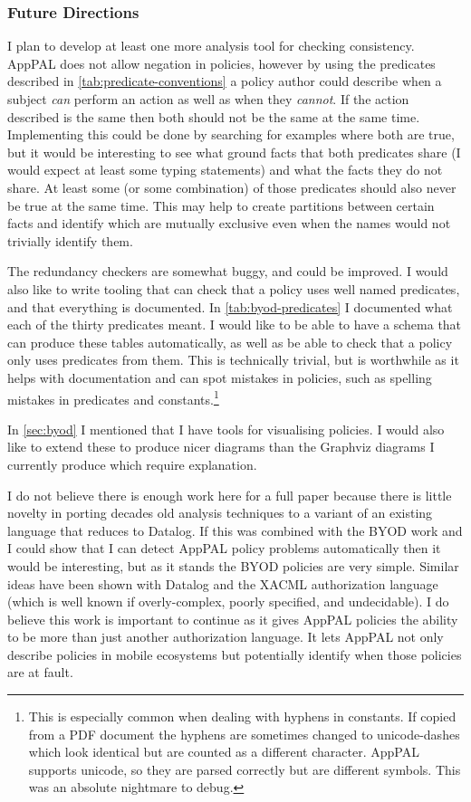 \documentclass[a4paper]{scrartcl}
\begin{document}
\subsubsection*{Future Directions}

I plan to develop at least one more analysis tool for checking consistency.
AppPAL does not allow negation in policies, however by using the predicates
described in \autoref{tab:predicate-conventions} a policy author could describe
when a subject \emph{can} perform an action as well as when they \emph{cannot}.
If the action described is the same then both should not be the same at the same
time.  Implementing this could be done by searching for examples where both are
true, but it would be interesting to see what ground facts that both
predicates share (I would expect at least some typing statements) and
what the facts they do not share.  At least some (or some combination) of those
predicates should also never be true at the same time.  This may help to create
partitions between certain facts and identify which are mutually exclusive even
when the names would not trivially identify them.

The redundancy checkers are somewhat buggy, and could be improved.  I would
also like to write tooling that can check that a policy uses well named
predicates, and that everything is documented.  In
\autoref{tab:byod-predicates} I documented what each of the thirty predicates
meant.  I would like to be able to have a schema that can produce these tables
automatically, as well as be able to check that a policy only uses predicates
from them.  This is technically trivial, but is worthwhile as it helps with
documentation and can spot mistakes in policies, such as spelling mistakes in
predicates and constants.\footnote{This is especially common when dealing with
  hyphens in constants.  If copied from a PDF document the hyphens are
  sometimes changed to unicode-dashes which look identical but are counted as a
different character.  AppPAL supports unicode, so they are parsed correctly but
are different symbols.  This was an absolute nightmare to debug.}

In \autoref{sec:byod} I mentioned that I have tools for visualising policies.  I
would also like to extend these to produce nicer diagrams than the Graphviz
diagrams I currently produce which require explanation.  

I do not believe there is enough work here for a full paper because there is
little novelty in porting decades old analysis techniques to a variant of an
existing language that reduces to Datalog.  If this was combined with the BYOD work and I could show that I can detect AppPAL policy problems automatically then it would be interesting, but as it stands the BYOD policies are very simple.   Similar ideas have been shown with Datalog and the XACML authorization
language~\cite{ramli_detecting_2015} (which is well known if overly-complex, poorly specified, and
undecidable).  I do believe this work is important to continue as it gives
AppPAL policies the ability to be more than just another authorization
language. It lets AppPAL not only describe policies in mobile ecosystems but
potentially identify when those policies are at fault.
\end{document}

